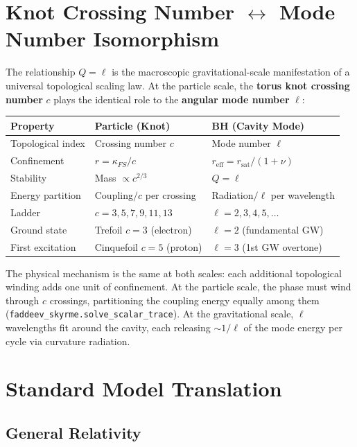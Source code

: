 \section{Knot Crossing Number $\leftrightarrow$ Mode Number Isomorphism}
\label{sec:knot_mode_isomorphism}

The relationship $Q = \ell$ is the macroscopic gravitational-scale manifestation of a universal topological scaling law. At the particle scale, the \textbf{torus knot crossing number} $c$ plays the identical role to the \textbf{angular mode number} $\ell$:

\begin{center}
\renewcommand{\arraystretch}{1.3}
\begin{tabular}{l l l}
\toprule
\textbf{Property} & \textbf{Particle (Knot)} & \textbf{BH (Cavity Mode)} \\
\midrule
Topological index & Crossing number $c$ & Mode number $\ell$ \\
Confinement & $r = \kappa_{FS} / c$ & $r_\mathrm{eff} = r_\mathrm{sat}/(1+\nu)$ \\
Stability & Mass $\propto c^{2/3}$ & $Q = \ell$ \\
Energy partition & Coupling$/c$ per crossing & Radiation$/\ell$ per wavelength \\
Ladder & $c = 3, 5, 7, 9, 11, 13$ & $\ell = 2, 3, 4, 5, \ldots$ \\
Ground state & Trefoil $c = 3$ (electron) & $\ell = 2$ (fundamental GW) \\
First excitation & Cinquefoil $c = 5$ (proton) & $\ell = 3$ (1st GW overtone) \\
\bottomrule
\end{tabular}
\end{center}

\noindent The physical mechanism is the same at both scales: each additional topological winding adds one unit of confinement. At the particle scale, the phase must wind through $c$ crossings, partitioning the coupling energy equally among them (\texttt{faddeev\_skyrme.solve\_scalar\_trace}). At the gravitational scale, $\ell$ wavelengths fit around the cavity, each releasing $\sim 1/\ell$ of the mode energy per cycle via curvature radiation.


\section{Standard Model Translation}
\label{sec:sm_translation}

\subsection{General Relativity}

